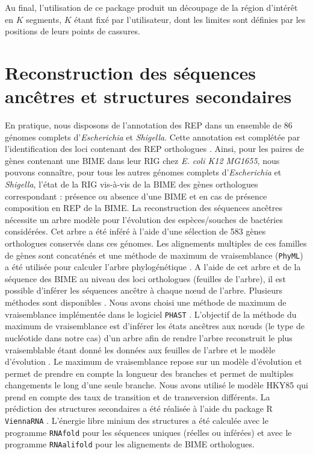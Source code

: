 \documentclass[12pt,a4paper]{report}
\begin{document}
\begin{onehalfspace}
Au final, l'utilisation de ce package produit un découpage de la région d'intérêt en $K$ segments, $K$ étant fixé par l'utilisateur, dont les limites sont définies par les positions de leurs points de cassures.

\section*{Reconstruction des séquences ancêtres et structures secondaires}
En pratique, nous disposons de l’annotation des REP dans un ensemble de 86 génomes complets d’\textit{Escherichia} et \textit{Shigella}. Cette annotation est complétée par l’identification des loci contenant des REP orthologues \citep{Weyder2013}. Ainsi, pour les paires de gènes contenant une BIME dans leur RIG chez \textit{E. coli K12 MG1655}, nous pouvons connaître, pour tous les autres génomes complets  d’\textit{Escherichia} et \textit{Shigella}, l’état de la RIG vis-à-vis de la BIME des gènes orthologues correspondant : présence ou absence d’une BIME et en cas de présence composition en REP de la BIME. 
La reconstruction des séquences ancêtres nécessite un arbre modèle pour l’évolution des espèces/souches de bactéries considérées. Cet arbre a été inféré à l’aide d’une sélection de  583 gènes orthologues conservés dans ces génomes. Les alignements multiples de ces familles de gènes sont concaténés et une méthode de maximum de vraisemblance (\texttt{PhyML}) a été utilisée pour calculer l’arbre phylogénétique \citep{Weyder2013}. A l’aide de cet arbre et de la séquence des BIME au niveau des loci orthologues (feuilles de l’arbre), il est possible d’inférer les séquences ancêtre à chaque nœud de l’arbre. Plusieurs méthodes sont disponibles \citep{Bosc2014}. Nous avons choisi une méthode de maximum de vraisemblance implémentée dans le logiciel \texttt{PHAST} \citep{Hubisz2011}. L'objectif de la méthode du maximum de vraisemblance est d’inférer les états ancêtres aux nœuds (le type de nucléotide dans notre cas) d'un arbre afin de rendre l'arbre reconstruit le plus vraisemblable étant donné les données aux feuilles de l'arbre et le modèle d'évolution \citep{Pagel1999}. Le maximum de vraisemblance repose sur un modèle d’évolution et permet de prendre en compte la longueur des branches et permet de multiples changements le long d'une seule branche. Nous avons utilisé le modèle HKY85 qui prend en compte des taux de transition et de transversion différents. 
La prédiction des structures secondaires a été réalisée à l’aide du package R \texttt{ViennaRNA} \citep{Lorenz2011}. L’énergie libre minium des structures a été calculée avec le programme \texttt{RNAfold}  pour les séquences uniques (réelles ou inférées) et avec le programme \texttt{RNAalifold} pour les alignements de BIME orthologues. 


\end{onehalfspace}
\end{document}
